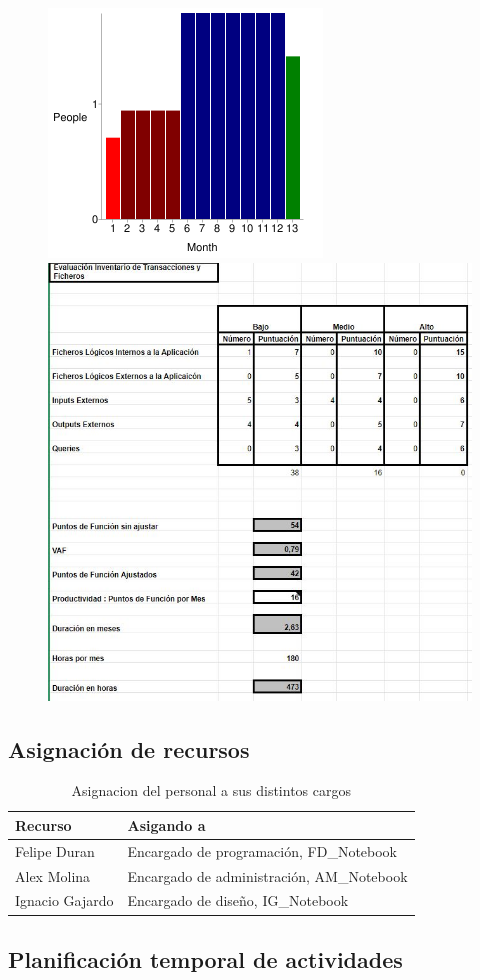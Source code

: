 \begin{figure}[htbp]
	\includegraphics{imgs/Grafica.png}
	\includegraphics[scale=0.5]{imgs/Estimacion de PF.JPG}
\end{figure}

\subsection{Asignación de recursos}
\begin{table}[H]
    \begin{center}
        \begin{tabular}{| l | m{12cm} |}        
        	\hline 
        	Recurso & Asigando a \\
        	\hline
        	Felipe Duran & Encargado de programación, FD\_Notebook\\
        	\hline
        	Alex Molina & Encargado de administración, AM\_Notebook\\
        	\hline
        	Ignacio Gajardo & Encargado de diseño, IG\_Notebook\\
        	\hline
        \end{tabular}
    \caption{Asignacion del personal a sus distintos cargos}
    \end{center}
\end{table}
\subsection{Planificación temporal de actividades}